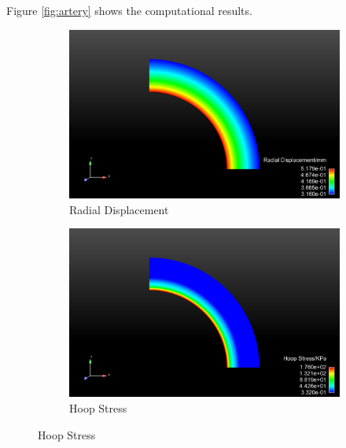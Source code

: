 Figure \ref{fig:artery} shows the computational results.
\begin{figure}[t!p]
	\begin{subfigure}[b]{0.5\textwidth}
		\centering
		\includegraphics[width=\textwidth]{./figures/artery_ur.png}
		\caption{Radial Displacement}
		\label{ur_artery}
	\end{subfigure}
	\begin{subfigure}[b]{0.5\textwidth}
		\centering
		\includegraphics[width=\textwidth]{./figures/artery_hoop.png}
		\caption{Hoop Stress}
		\label{hoop_artery}
	\end{subfigure}
	

\end{figure}
